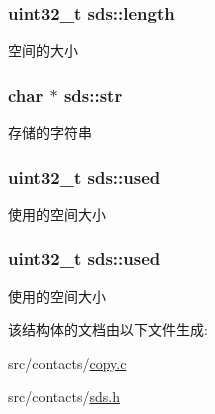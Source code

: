 \subsubsection[{\texorpdfstring{length}{length}}]{\setlength{\rightskip}{0pt plus 5cm}uint32\+\_\+t sds\+::length}\hypertarget{structsds_a333f14feb33f9719162f37377629716a}{}\label{structsds_a333f14feb33f9719162f37377629716a}
空间的大小 
\subsubsection[{\texorpdfstring{str}{str}}]{\setlength{\rightskip}{0pt plus 5cm}char $\ast$ sds\+::str}\hypertarget{structsds_a3c48d440195e1e20c013334cd8dc3884}{}\label{structsds_a3c48d440195e1e20c013334cd8dc3884}
存储的字符串 
\subsubsection[{\texorpdfstring{used}{used}}]{\setlength{\rightskip}{0pt plus 5cm}uint32\+\_\+t sds\+::used}\hypertarget{structsds_a5d733da962855ed70322d900c51eb65f}{}\label{structsds_a5d733da962855ed70322d900c51eb65f}
使用的空间大小 
\subsubsection[{\texorpdfstring{used}{used}}]{\setlength{\rightskip}{0pt plus 5cm}uint32\+\_\+t sds\+::used}\hypertarget{structsds_a5d733da962855ed70322d900c51eb65f}{}\label{structsds_a5d733da962855ed70322d900c51eb65f}
使用的空间大小 

该结构体的文档由以下文件生成\+:\begin{DoxyCompactItemize}
\item 
src/contacts/\hyperlink{copy_8c}{copy.\+c}\item 
src/contacts/\hyperlink{contacts_2sds_8h}{sds.\+h}\end{DoxyCompactItemize}
